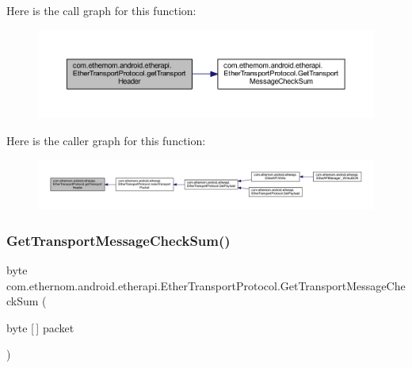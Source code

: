 Here is the call graph for this function\+:\nopagebreak
\begin{figure}[H]
\begin{center}
\leavevmode
\includegraphics[width=350pt]{classcom_1_1ethernom_1_1android_1_1etherapi_1_1_ether_transport_protocol_ae2c4357c0d53349f62bef02091b1577a_cgraph}
\end{center}
\end{figure}
Here is the caller graph for this function\+:
\nopagebreak
\begin{figure}[H]
\begin{center}
\leavevmode
\includegraphics[width=350pt]{classcom_1_1ethernom_1_1android_1_1etherapi_1_1_ether_transport_protocol_ae2c4357c0d53349f62bef02091b1577a_icgraph}
\end{center}
\end{figure}
\mbox{\label{classcom_1_1ethernom_1_1android_1_1etherapi_1_1_ether_transport_protocol_a2689adc9963e71cb1f6814c331c6ffa5}} 
\subsubsection{\texorpdfstring{Get\+Transport\+Message\+Check\+Sum()}{GetTransportMessageCheckSum()}}
{\footnotesize\ttfamily byte com.\+ethernom.\+android.\+etherapi.\+Ether\+Transport\+Protocol.\+Get\+Transport\+Message\+Check\+Sum (\begin{DoxyParamCaption}\item[{byte \mbox{[}$\,$\mbox{]}}]{packet }\end{DoxyParamCaption})}



